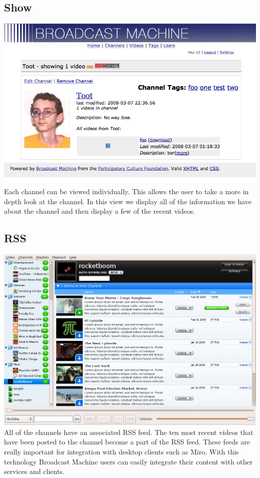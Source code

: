 \documentclass[a4paper,12pt]{report}
\begin{document}
\subsection{Show}
\includegraphics{images/channelshow.png}
Each channel can be viewed individually.
This allows the user to take a more in depth look at the channel.
In this view we display all of the information we have about the channel and then display a few of the recent videos.

\subsection{RSS}
\includegraphics{images/channelrss.png}
All of the channels have an associated RSS feed.
The ten most recent videos that have been posted to the channel become a part of the RSS feed.
These feeds are really important for integration with desktop clients such as Miro.
With this technology Broadcast Machine users can easily integrate their content with other services and clients.
\end{document}
